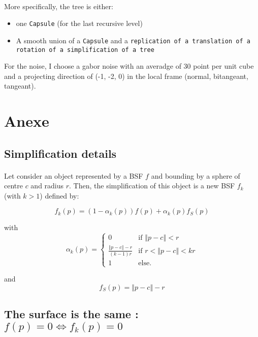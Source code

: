 \documentclass[a4paper,12pt]{article}
\begin{document}
\paragraph{} More specifically, the tree is either:
\begin{itemize}
	\item one \texttt{Capsule} (for the last recursive level)
	\item A smooth union of a \texttt{Capsule} and a \texttt{replication of a translation of a rotation of a simplification of a tree}
\end{itemize}

For the noise, I choose a gabor noise with an averadge of 30 point per unit cube and a projecting direction of (-1, -2, 0) in the local frame (normal, bitangeant, tangeant).




\section*{Anexe}

\subsection*{Simplification details}

\paragraph{} Let consider an object represented by a BSF $f$ and bounding by a sphere of centre $c$ and radius $r$. Then, the simplification of this object is a new BSF $f_k$ (with $k>1$) defined by:


\[
f_k(p) = (1-\alpha_k(p))f(p) + \alpha_k(p)f_S(p)
\]

with
\[
\alpha_k(p) = \left\{\begin{array}{lll}
	0 & \mbox{if } \left\Vert p - c \right\Vert < r \\
	\frac{\left\Vert p - c \right\Vert - r}{(k-1)r} & \mbox{if } r < \left\Vert p - c \right\Vert < kr \\
	1 & \mbox{else.}
	\end{array}
	\right.
\]

and
\[
f_S(p) = \left\Vert p - c \right\Vert - r
\]

\subsection*{The surface is the same : $f(p)=0 \Leftrightarrow f_k(p)=0$}
\end{document}
